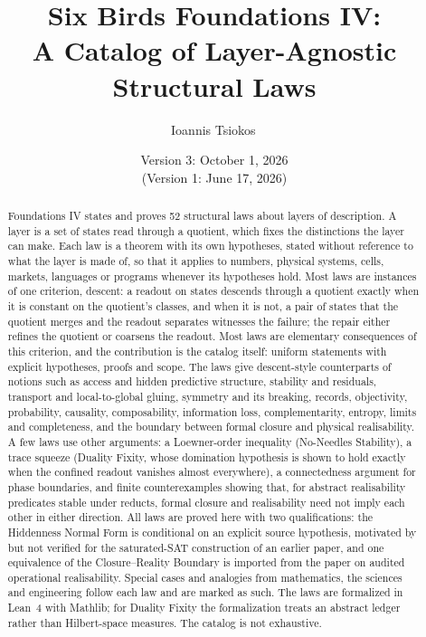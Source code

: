\documentclass[11pt]{article}
\title{Six Birds Foundations IV:\\
A Catalog of Layer-Agnostic Structural Laws}
\author{Ioannis Tsiokos\,\orcidlink{0009-0009-7659-5964}}
\date{Version 3: October 1, 2026\\[2pt] \footnotesize (Version 1: June 17, 2026)}
\theoremstyle{definition}
\begin{document}
\sloppy
{}

\maketitle
\thispagestyle{firstpage}

\begin{abstract}
Foundations IV states and proves 52 structural laws about layers of
description.  A layer is a set of states read through a quotient, which
fixes the distinctions the layer can make.  Each law is a theorem with
its own hypotheses, stated without reference to what the layer is made
of, so that it applies to numbers, physical systems, cells, markets,
languages or programs whenever its hypotheses hold.  Most laws are
instances of one criterion, descent: a readout on states descends
through a quotient exactly when it is constant on the quotient's
classes, and when it is not, a pair of states that the quotient merges
and the readout separates witnesses the failure; the repair either
refines the quotient or coarsens the readout.  Most laws are
elementary consequences of this criterion, and the contribution is the
catalog itself: uniform statements with explicit hypotheses, proofs and
scope.  The laws give descent-style counterparts of notions such as
access and hidden predictive structure, stability and residuals,
transport and local-to-global gluing, symmetry and its breaking,
records, objectivity, probability, causality, composability,
information loss, complementarity, entropy, limits and completeness,
and the boundary between formal closure and physical realisability.  A
few laws use other arguments: a Loewner-order inequality (No-Needles
Stability), a trace squeeze (Duality Fixity, whose domination
hypothesis is shown to hold exactly when the confined readout
vanishes almost everywhere), a connectedness argument for phase boundaries, and finite
counterexamples showing that, for abstract realisability predicates
stable under reducts, formal closure and realisability need not imply
each other in either direction.  All laws
are proved here with two qualifications: the Hiddenness Normal Form is
conditional on an explicit source hypothesis, motivated by but not
verified for the saturated-SAT construction of an earlier paper, and
one equivalence of the Closure--Reality Boundary is imported from the
paper on audited operational realisability.  Special cases and analogies
from mathematics, the sciences and engineering follow each law and are
marked as such.  The laws are formalized in Lean~4 with Mathlib; for Duality
Fixity the formalization treats an abstract ledger rather than
Hilbert-space measures.
The catalog is not exhaustive.
\end{abstract}
\end{document}
